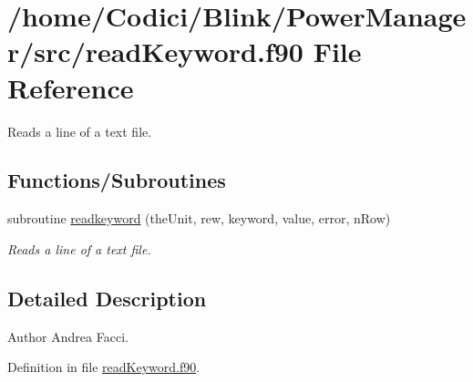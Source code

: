 \hypertarget{read_keyword_8f90}{\section{/home/\-Codici/\-Blink/\-Power\-Manager/src/read\-Keyword.f90 File Reference}
\label{read_keyword_8f90}
}


Reads a line of a text file.  


\subsection*{Functions/\-Subroutines}
\begin{DoxyCompactItemize}
\item 
subroutine \hyperlink{read_keyword_8f90_a25147e00369196a9059879141682718f}{readkeyword} (the\-Unit, rew, keyword, value, error, n\-Row)
\begin{DoxyCompactList}\small\item\em Reads a line of a text file. \end{DoxyCompactList}\end{DoxyCompactItemize}


\subsection{Detailed Description}
\begin{DoxyAuthor}{Author}
Andrea Facci. 
\end{DoxyAuthor}


Definition in file \hyperlink{read_keyword_8f90_source}{read\-Keyword.\-f90}.



